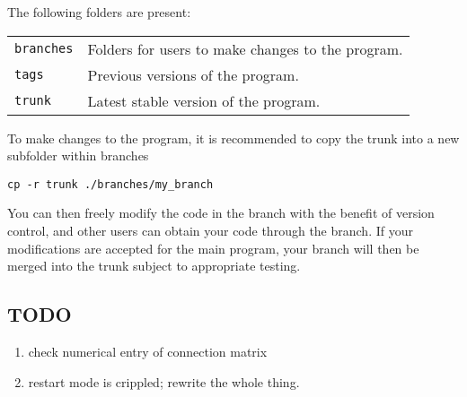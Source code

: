 \documentclass[12pt,a4paper]{article}
\newcommand{\type}[1]{ {\small\small\tt #1} }
\begin{document}
The following folders are present:

\begin{tabular}{l p{12cm}}
\type{branches}& Folders for users to make changes to the program.\\
\type{tags}& Previous versions of the program.\\
\type{trunk}& Latest stable version of the program.\\
\end{tabular}

To make changes to the program, it is recommended to copy the trunk into a new subfolder within branches

\begin{lstlisting}
cp -r trunk ./branches/my_branch
\end{lstlisting}
	
You can then freely modify the code in the branch with the benefit of version control, and other users can obtain your code through the branch. If your modifications are accepted for the main program, your branch will then be merged into the trunk subject to appropriate testing.

\subsection{TODO}
\begin{enumerate}
\item check numerical entry of connection matrix
\item restart mode is crippled; rewrite the whole thing.
\end{enumerate}
\end{document}
